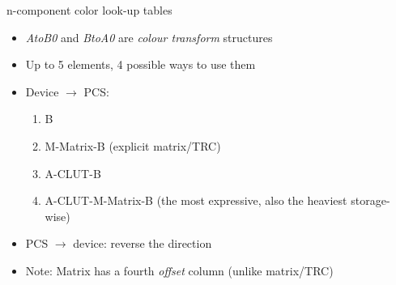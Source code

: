 \documentclass[final, aspectratio=169]{divoc}
\begin{document}
\begin{frame}{n-component color look-up tables}
  \begin{itemize}
    \item \emph{AtoB0} and \emph{BtoA0} are \emph{colour transform} structures
    \item Up to 5 elements, 4 possible ways to use them
    \item Device $\rightarrow$ PCS:
          \begin{enumerate}
            \item B
            \item M-Matrix-B (explicit matrix/TRC)
            \item A-CLUT-B
            \item A-CLUT-M-Matrix-B (the most expressive, also the heaviest storage-wise)
          \end{enumerate}
    \item PCS $\rightarrow$ device: reverse the direction
    \item Note: Matrix has a fourth \emph{offset} column (unlike matrix/TRC)
  \end{itemize}
\end{frame}
\end{document}
